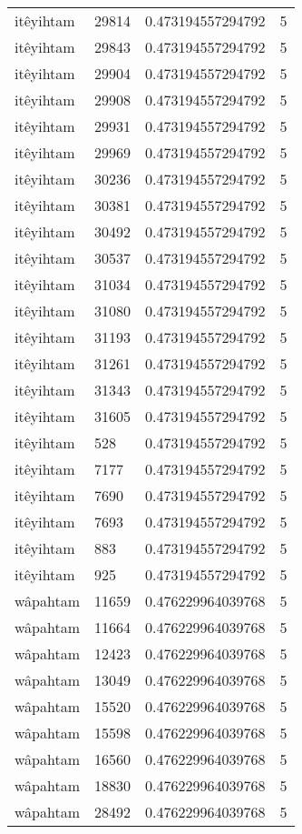 \begin{longtable}{llll}
itêyihtam & 29814 & 0.473194557294792 & 5 \\
itêyihtam & 29843 & 0.473194557294792 & 5 \\
itêyihtam & 29904 & 0.473194557294792 & 5 \\
itêyihtam & 29908 & 0.473194557294792 & 5 \\
itêyihtam & 29931 & 0.473194557294792 & 5 \\
itêyihtam & 29969 & 0.473194557294792 & 5 \\
itêyihtam & 30236 & 0.473194557294792 & 5 \\
itêyihtam & 30381 & 0.473194557294792 & 5 \\
itêyihtam & 30492 & 0.473194557294792 & 5 \\
itêyihtam & 30537 & 0.473194557294792 & 5 \\
itêyihtam & 31034 & 0.473194557294792 & 5 \\
itêyihtam & 31080 & 0.473194557294792 & 5 \\
itêyihtam & 31193 & 0.473194557294792 & 5 \\
itêyihtam & 31261 & 0.473194557294792 & 5 \\
itêyihtam & 31343 & 0.473194557294792 & 5 \\
itêyihtam & 31605 & 0.473194557294792 & 5 \\
itêyihtam & 528 & 0.473194557294792 & 5 \\
itêyihtam & 7177 & 0.473194557294792 & 5 \\
itêyihtam & 7690 & 0.473194557294792 & 5 \\
itêyihtam & 7693 & 0.473194557294792 & 5 \\
itêyihtam & 883 & 0.473194557294792 & 5 \\
itêyihtam & 925 & 0.473194557294792 & 5 \\
wâpahtam & 11659 & 0.476229964039768 & 5 \\
wâpahtam & 11664 & 0.476229964039768 & 5 \\
wâpahtam & 12423 & 0.476229964039768 & 5 \\
wâpahtam & 13049 & 0.476229964039768 & 5 \\
wâpahtam & 15520 & 0.476229964039768 & 5 \\
wâpahtam & 15598 & 0.476229964039768 & 5 \\
wâpahtam & 16560 & 0.476229964039768 & 5 \\
wâpahtam & 18830 & 0.476229964039768 & 5 \\
wâpahtam & 28492 & 0.476229964039768 & 5 \\

\end{longtable}
